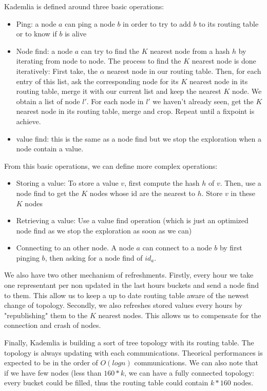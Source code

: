 \documentclass[a4paper]{article}
\begin{document}
Kademlia is defined around three basic operations:
\begin{itemize}
    \item Ping: a node $a$ can ping a node $b$ in order to try to add $b$ to its routing table or to know if $b$ is alive
    \item Node find: a node $a$ can try to find the $K$ nearest node from a hash $h$ by iterating from node to node. The process to find the $K$ nearest node is done iteratively: First take, the $\alpha$ nearest node in our routing table. Then, for each entry of this list, ask the corresponding node for its $K$ nearest node in its routing table, merge it with our current list and keep the nearest $K$  node. We obtain a list of node $l'$. For each node in $l'$ we haven't already seen, get the $K$ nearest node in its routing table, merge and crop. Repeat until a fixpoint is achieve.
    \item value find: this is the same as a node find but we stop the exploration when a node contain a value.
\end{itemize}

From this basic operations, we can define more complex operations:
\begin{itemize}
    \item Storing a value: To store a value $v$, first compute the hash $h$ of $v$. Then, use a node find to get the $K$ nodes whose id are the nearest to $h$. Store $v$ in these $K$ nodes
    \item Retrieving a value: Use a value find operation (which is just an optimized node find as we stop the exploration as soon as we can)
    \item Connecting to an other node. A node $a$ can connect to a node $b$ by first pinging $b$, then asking for a node find of $id_a$.
\end{itemize}


We also have two other mechanism of refreshments. Firstly, every hour we take one representant per non updated in the last hours buckets and send a node find to them. This allow us to keep a up to date routing table aware of the newest change of topology. 
Secondly, we also refreshes stored values every hours by "republishing" them to the $K$ nearest nodes. This allows us to compensate for the connection and crash of nodes.


Finally, Kademlia is building a sort of tree topology with its routing table. The topology is always updating with each communications. Theorical performances is expected to be in the order of $O(log n)$ communications. We can also note that if we have few nodes (less than $160*k$, we can have a fully connected topology: every bucket could be filled, thus the routing table could contain $k*160$ nodes.
\end{document}
